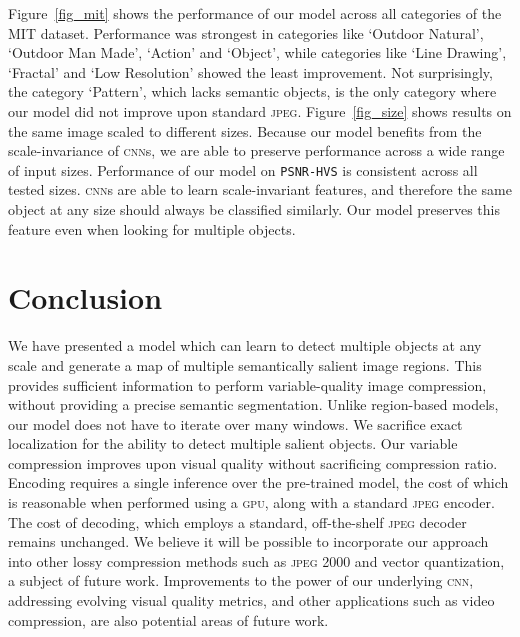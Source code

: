 Figure~\ref{fig_mit} shows the performance of our model across all categories of the MIT dataset.
Performance was strongest in categories like `Outdoor Natural', `Outdoor Man Made', `Action' and `Object', while categories like `Line Drawing', `Fractal' and `Low Resolution' showed the least improvement.
Not surprisingly, the category `Pattern', which lacks semantic objects, is the only category where our model did not improve upon standard \textsc{jpeg}.
Figure~\ref{fig_size} shows results on the same image scaled to different sizes. 
Because our model benefits from the scale-invariance of \textsc{cnn}s, we are able to preserve performance across a wide range of input sizes.
Performance of our model on \texttt{PSNR-HVS} is consistent across all tested sizes. \textsc{cnn}s are able to learn scale-invariant features, and therefore the same object at any size should always be classified similarly.
Our model preserves this feature even when looking for multiple objects.


    

\section{Conclusion}
We have presented a model which can learn to detect multiple objects at any scale and generate a map of multiple semantically salient image regions.
This provides sufficient information to perform variable-quality image compression, without providing a precise semantic segmentation.
Unlike region-based models, our model does not have to iterate over many windows.
We sacrifice exact localization for the ability to detect multiple salient objects.
Our variable compression improves upon visual quality without sacrificing compression ratio. 
Encoding requires a single inference over the pre-trained model, the cost of which is reasonable when performed using a \textsc{gpu}, along with a standard \textsc{jpeg} encoder. The cost of decoding, which employs a standard, off-the-shelf \textsc{jpeg} decoder remains unchanged.
We believe it will be possible to incorporate our approach into other lossy compression methods such as \textsc{jpeg} 2000 and vector quantization, a subject of future work.
Improvements to the power of our underlying \textsc{cnn}, addressing evolving visual quality metrics, and other applications such as video compression, are also potential areas of future work.